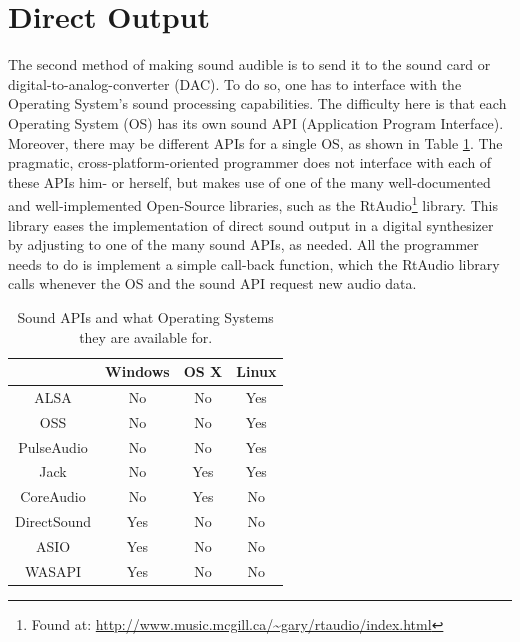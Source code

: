 \section{Direct Output}

The second method of making sound audible is to send it to the sound card or digital-to-analog-converter (DAC). To do so, one has to interface with the Operating System's sound processing capabilities. The difficulty here is that each Operating System (OS) has its own sound API (Application Program Interface). Moreover, there may be different APIs for a single OS, as shown in Table \ref{tb:dac}. The pragmatic, cross-platform-oriented programmer does not interface with each of these APIs him- or herself, but makes use of one of the many well-documented and well-implemented Open-Source libraries, such as the RtAudio\footnote{Found at: \url{http://www.music.mcgill.ca/~gary/rtaudio/index.html}} library. This library eases the implementation of direct sound output in a digital synthesizer by adjusting to one of the many sound APIs, as needed. All the programmer needs to do is implement a simple call-back function, which the RtAudio library calls whenever the OS and the sound API request new audio data.

\begin{table}[h!]

  \begin{tabular}{c|c|c|c|}
    \cline{2-4}
    & Windows & OS X & Linux \\
    \hline
    \multicolumn{1}{|c|}{ALSA} & No & No & Yes \\
    \hline
    \multicolumn{1}{|c|}{OSS} & No & No & Yes \\
    \hline
    \multicolumn{1}{|c|}{PulseAudio} & No & No & Yes \\
    \hline
    \multicolumn{1}{|c|}{Jack} & No & Yes & Yes \\
    \hline
    \multicolumn{1}{|c|}{CoreAudio} & No & Yes & No \\
    \hline
    \multicolumn{1}{|c|}{DirectSound} & Yes & No & No \\
    \hline
    \multicolumn{1}{|c|}{ASIO} & Yes & No & No \\
    \hline
    \multicolumn{1}{|c|}{WASAPI} & Yes & No & No \\
    \hline
  \end{tabular}

  \caption{Sound APIs and what Operating Systems they are available for.}

  \label{tb:dac}

\end{table}
